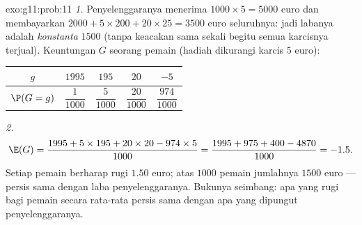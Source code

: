 \begin{solution}{exo:g11:prob:11}
\emph{1.} Penyelenggaranya menerima $1000 \times 5 = 5000$ euro dan membayarkan
$2000 + 5 \times 200 + 20 \times 25 = 3500$ euro seluruhnya: jadi labanya
adalah \emph{konstanta} $1500$ (tanpa keacakan sama sekali begitu semua
karcisnya terjual). Keuntungan $G$ seorang pemain (hadiah dikurangi karcis $5$ euro):
\begin{center}
\begin{tabular}{c|cccc}
$g$ & $1995$ & $195$ & $20$ & $-5$\\
\hline\rule{0pt}{11pt}%
$\P(G=g)$ & $\dfrac{1}{1000}$ & $\dfrac{5}{1000}$ & $\dfrac{20}{1000}$
& $\dfrac{974}{1000}$
\end{tabular}
\end{center}

\emph{2.}
\[
\E(G) = \frac{1995 + 5 \times 195 + 20 \times 20 - 974 \times 5}{1000}
= \frac{1995 + 975 + 400 - 4870}{1000} = -1.5 .
\]
Setiap pemain berharap rugi $1.50$ euro; atas $1000$ pemain jumlahnya
$1500$ euro --- persis sama dengan laba penyelenggaranya. Bukunya seimbang:
apa yang rugi bagi pemain secara rata-rata persis sama dengan apa yang
dipungut penyelenggaranya.
\end{solution}

